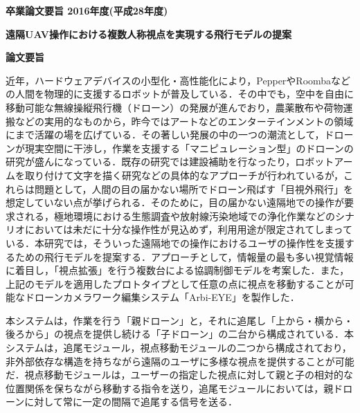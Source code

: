 \begin{center}
\textbf{\Large 卒業論文要旨 2016年度(平成28年度)}

\vspace{6.18mm}

\textbf{\Large 遠隔UAV操作における複数人称視点を実現する飛行モデルの提案}
\end{center}

\vspace{10mm}

\begin{flushleft}
\textbf{論文要旨}\\
\end{flushleft}






近年，ハードウェアデバイスの小型化・高性能化により，PepperやRoombaなどの人間を物理的に支援するロボットが普及している．その中でも，空中を自由に移動可能な無線操縦飛行機（ドローン）の発展が進んでおり，農薬散布や荷物運搬などの実用的なものから，昨今ではアートなどのエンターテインメントの領域にまで活躍の場を広げている．その著しい発展の中の一つの潮流として，ドローンが現実空間に干渉し，作業を支援する「マニピュレーション型」のドローンの研究が盛んになっている．既存の研究では建設補助を行なったり，ロボットアームを取り付けて文字を描く研究などの具体的なアプローチが行われているが，これらは問題として，人間の目の届かない場所でドローン飛ばす「目視外飛行」を想定していない点が挙げられる．そのために，目の届かない遠隔地での操作が要求される，極地環境における生態調査や放射線汚染地域での浄化作業などのシナリオにおいては未だに十分な操作性が見込めず，利用用途が限定されてしまっている．本研究では，そういった遠隔地での操作におけるユーザの操作性を支援するための飛行モデルを提案する．アプローチとして，情報量の最も多い視覚情報に着目し，「視点拡張」を行う複数台による協調制御モデルを考案した．また，上記のモデルを適用したプロトタイプとして任意の点に視点を移動することが可能なドローンカメラワーク編集システム「Arbi-EYE」を製作した．


本システムは，作業を行う「親ドローン」と，それに追尾し「上から・横から・後ろから」の視点を提供し続ける「子ドローン」の二台から構成されている．本システムは，追尾モジュール，視点移動モジュールの二つから構成されており，非外部依存な構造を持ちながら遠隔のユーザに多様な視点を提供することが可能だ．視点移動モジュールは，ユーザーの指定した視点に対して親と子の相対的な位置関係を保ちながら移動する指令を送り，追尾モジュールにおいては，親ドローンに対して常に一定の間隔で追尾する信号を送る．



